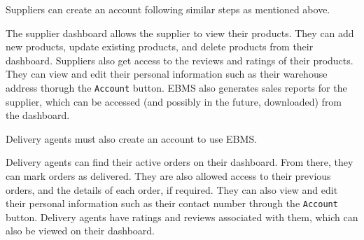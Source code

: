 \begin{stakeholder}[Suppliers]
    Suppliers can create an account following similar steps as mentioned above.

    The supplier dashboard allows the supplier to view their products.
    They can add new products, update existing products, and delete products from their dashboard.
    Suppliers also get access to the reviews and ratings of their products.
    They can view and edit their personal information such as their warehouse address thorugh the \texttt{Account} button.
    EBMS also generates sales reports for the supplier, which can be accessed (and possibly in the future, downloaded) from the dashboard.
\end{stakeholder}

\begin{stakeholder}
    Delivery agents must also create an account to use EBMS.

    Delivery agents can find their active orders on their dashboard.
    From there, they can mark orders as delivered.
    They are also allowed access to their previous orders, and the details of each order, if required.
    They can also view and edit their personal information such as their contact number through the \texttt{Account} button.
    Delivery agents have ratings and reviews associated with them, which can also be viewed on their dashboard.
\end{stakeholder}